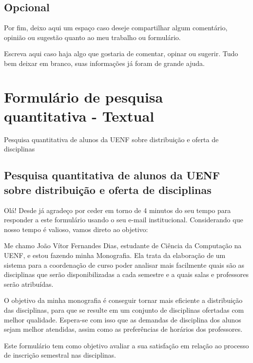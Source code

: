 \begin{apendicesenv}
\begin{Form}[action=mailto:joaovitorfd2000@gmai.com, encoding=html, method=post]
    \section*{Opcional}

    Por fim, deixo aqui um espaço caso deseje compartilhar algum comentário, opinião ou sugestão quanto ao meu trabalho ou formulário.

    Escreva aqui caso haja algo que gostaria de comentar, opinar ou sugerir. Tudo bem deixar em branco, suas informações já foram de grande ajuda.

    \TextField[multiline=true, width=0.8\linewidth, name=comentario]{ }


  \end{Form}

  \chapter{Formulário de pesquisa quantitativa - Textual} \label{apendice:FormularioPesquisaQuantitativaTextual}

  Pesquisa quantitativa de alunos da UENF sobre distribuição e oferta de disciplinas

  \section*{Pesquisa quantitativa de alunos da UENF sobre distribuição e oferta de disciplinas}

  Olá! Desde já agradeço por ceder em torno de 4 minutos do seu tempo para responder a este formulário usando o seu e-mail institucional. Considerando que nosso tempo é valioso, vamos direto ao objetivo:

  Me chamo João Vítor Fernandes Dias, estudante de Ciência da Computação na UENF, e estou fazendo minha Monografia. Ela trata da elaboração de um sistema para a coordenação de curso poder analisar mais facilmente quais são as disciplinas que serão disponibilizadas a cada semestre e a quais salas e professores serão atribuídas.

  O objetivo da minha monografia é conseguir tornar mais eficiente a distribuição das disciplinas, para que se resulte em um conjunto de disciplinas ofertadas com melhor qualidade. Espera-se com isso que as demandas de disciplina dos alunos sejam melhor atendidas, assim como as preferências de horários dos professores.

  Este formulário tem como objetivo avaliar a sua satisfação em relação ao processo de inscrição semestral nas disciplinas.


\end{apendicesenv}
